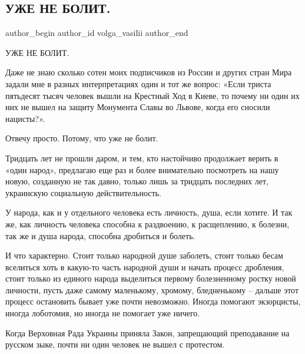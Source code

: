  
 
 
 
 
 
\subsection{УЖЕ НЕ БОЛИТ.}
\label{sec:02_08_2021.fb.volga_vasilii.1.uzhe_ne_bolit}
 
\ifcmt
 author_begin
   author_id volga_vasilii
 author_end
\fi

УЖЕ НЕ БОЛИТ.

Даже не знаю сколько сотен моих подписчиков из России и других стран Мира
задали мне в разных интерпретациях один и тот же вопрос: «Если триста пятьдесят
тысяч человек вышли на Крестный Ход в Киеве, то почему ни один их них не вышел
на защиту Монумента Славы во Львове, когда его сносили нацисты?». 

Отвечу просто. Потому, что уже не болит. 

Тридцать лет не прошли даром, и тем, кто настойчиво продолжает верить в «один
народ», предлагаю еще раз и более внимательно посмотреть на нашу новую,
созданную не так давно, только лишь за тридцать последних лет, украинскую
социальную действительность. 

У народа, как и у отдельного человека есть личность, душа, если хотите. И так
же, как личность человека способна к раздвоению, к расщеплению, к болезни, так
же и душа народа, способна дробиться и болеть. 

И что характерно. Стоит только народной душе заболеть, стоит только бесам
вселиться хоть в какую-то часть народной души и начать процесс дробления, стоит
только из единого народа выделиться первому болезненному ростку новой личности,
пусть даже самому маленькому, хромому, бледненькому – дальше этот процесс
остановить бывает уже почти невозможно. Иногда помогают экзорцисты, иногда
лоботомия, но иногда не помогает уже ничего. 

Когда Верховная Рада Украины приняла Закон, запрещающий преподавание на русском
зыке, почти ни один человек не вышел с протестом. 

